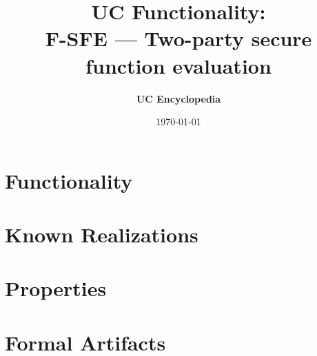 \documentclass[11pt,a4paper]{article}
\title{\textbf{\Large UC Functionality:}\\[0.2em] \Large F-SFE --- Two-party secure function evaluation}
\author{\textbf{UC Encyclopedia}}
\date{\today}
\newtheorem{functionality}{Functionality}
\begin{document}
\maketitle

\begin{abstract}
\end{abstract}

\section{Functionality}

%

\section{Known Realizations}


\section{Properties}


\section{Formal Artifacts}

\end{document}
